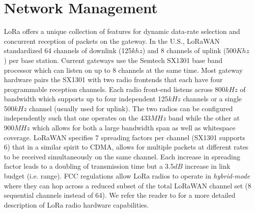 \section{Network Management}
\label{sec:net-scale}



LoRa offers a unique collection of features for dynamic data-rate selection and concurrent reception of packets on the gateway. In the U.S., LoRaWAN standardized 64 channels of downlink (125$khz$) and 8 channels of uplink (500$Khz$) per base station. Current gateways use the Semtech SX1301 base band processor which can listen on up to 8 channels at the same time. Most gateway hardware pairs the SX1301 with two radio frontends that each have four programmable reception channels. Each radio front-end listens across 800$kHz$ of bandwidth which supports up to four independent 125$kHz$ channels or a single 500$kHz$ channel (usually used for uplink).  The two radios can be configured independently such that one operates on the 433$MHz$ band while the other at 900$MHz$ which allows for both a large bandwidth span as well as whitespace coverage.  LoRaWAN specifies 7 spreading factors per channel (SX1301 supports 6) that in a similar spirit to CDMA, allows for multiple packets at different rates to be received simultaneously on the same channel.  Each increase in spreading factor leads to a doubling of transmission time but a 3.5$dB$ increase in link budget (i.e. range).  FCC regulations allow LoRa radios to operate in {\em hybrid-mode} where they can hop across a reduced subset of the total LoRaWAN channel set (8 sequential channels instead of 64). We refer the reader to \cite{sx1301} for a more detailed description of LoRa radio hardware capabilities.

